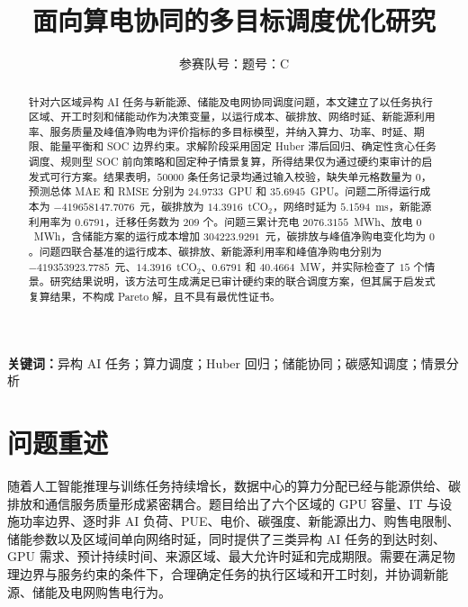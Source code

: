 \documentclass[withoutpreface,bwprint]{cumcmthesis}
\title{面向算电协同的多目标调度优化研究}
\author{参赛队号：\quad 题号：C}
\date{}
\begin{document}
\maketitle

\begin{abstract}
针对六区域异构 AI 任务与新能源、储能及电网协同调度问题，本文建立了以任务执行区域、开工时刻和储能动作为决策变量，以运行成本、碳排放、网络时延、新能源利用率、服务质量及峰值净购电为评价指标的多目标模型，并纳入算力、功率、时延、期限、能量平衡和 SOC 边界约束。求解阶段采用固定 Huber 滞后回归、确定性贪心任务调度、规则型 SOC 前向策略和固定种子情景复算，所得结果仅为通过硬约束审计的启发式可行方案。结果表明，$50000$ 条任务记录均通过输入校验，缺失单元格数量为 $0$，预测总体 MAE 和 RMSE 分别为 $24.9733$~GPU 和 $35.6945$~GPU。问题二所得运行成本为 $-419658147.7076$~元，碳排放为 $14.3916$~tCO$_2$，网络时延为 $5.1594$~ms，新能源利用率为 $0.6791$，迁移任务数为 $209$ 个。问题三累计充电 $2076.3155$~MWh、放电 $0$~MWh，含储能方案的运行成本增加 $304223.9291$~元，碳排放与峰值净购电变化均为 $0$。问题四联合基准的运行成本、碳排放、新能源利用率和峰值净购电分别为 $-419353923.7785$~元、$14.3916$~tCO$_2$、$0.6791$ 和 $40.4664$~MW，并实际检查了 $15$ 个情景。研究结果说明，该方法可生成满足已审计硬约束的联合调度方案，但其属于启发式复算结果，不构成 Pareto 解，且不具有最优性证书。
\end{abstract}

\noindent\textbf{关键词：}异构 AI 任务；算力调度；Huber 回归；储能协同；碳感知调度；情景分析

\clearpage

\small
\linespread{0.94}\selectfont
\setlength{\parskip}{0pt}
\setlength{\abovedisplayskip}{4pt plus 1pt minus 1pt}
\setlength{\belowdisplayskip}{4pt plus 1pt minus 1pt}
\setlength{\abovedisplayshortskip}{3pt plus 1pt minus 1pt}
\setlength{\belowdisplayshortskip}{3pt plus 1pt minus 1pt}
\setlength{\textfloatsep}{8pt plus 2pt minus 2pt}
\setlength{\floatsep}{7pt plus 2pt minus 2pt}
\setlength{\intextsep}{7pt plus 2pt minus 2pt}
\setlength{\abovecaptionskip}{3pt}
\setlength{\belowcaptionskip}{2pt}

\section{问题重述}

随着人工智能推理与训练任务持续增长，数据中心的算力分配已经与能源供给、碳排放和通信服务质量形成紧密耦合。题目给出了六个区域的 GPU 容量、IT 与设施功率边界、逐时非 AI 负荷、PUE、电价、碳强度、新能源出力、购售电限制、储能参数以及区域间单向网络时延，同时提供了三类异构 AI 任务的到达时刻、GPU 需求、预计持续时间、来源区域、最大允许时延和完成期限。需要在满足物理边界与服务约束的条件下，合理确定任务的执行区域和开工时刻，并协调新能源、储能及电网购售电行为。
\end{document}
